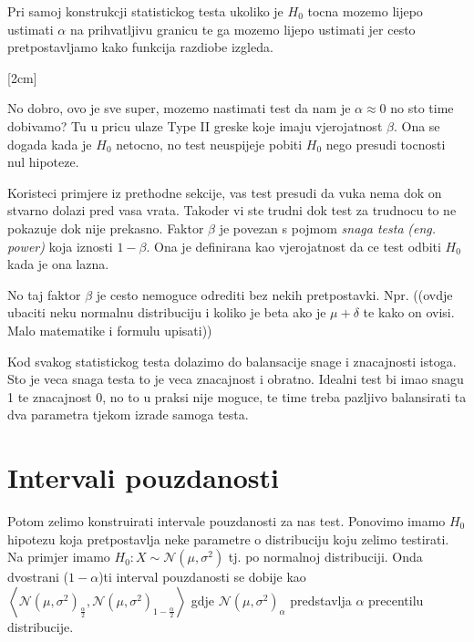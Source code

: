 Pri samoj konstrukcji statistickog testa ukoliko je $H_0$ tocna mozemo lijepo ustimati $\alpha$ na prihvatljivu granicu te ga mozemo lijepo ustimati jer cesto pretpostavljamo kako funkcija razdiobe izgleda. 

[2cm]

No dobro, ovo je sve super, mozemo nastimati test da nam je $\alpha \approx 0$ no sto time dobivamo? Tu u pricu ulaze Type II greske koje imaju vjerojatnost $\beta$. Ona se dogada kada je $H_0$ netocno, no test neuspijeje pobiti $H_0$ nego presudi tocnosti nul hipoteze.

Koristeci primjere iz prethodne sekcije, vas test presudi da vuka nema dok on stvarno dolazi pred vasa vrata. Takoder vi ste trudni dok test za trudnocu to ne pokazuje dok nije prekasno. Faktor $\beta$ je povezan s pojmom \emph{snaga testa} \textit{(eng. power)} koja iznosti $1-\beta$. Ona je definirana kao vjerojatnost da ce test odbiti $H_0$ kada je ona lazna. 

No taj faktor $\beta$ je cesto nemoguce odrediti bez nekih pretpostavki. Npr. ((ovdje ubaciti neku normalnu distribuciju i koliko je beta ako je $\mu  + \delta$ te kako on ovisi. Malo matematike i formulu upisati))

Kod svakog statistickog testa dolazimo do balansacije snage i znacajnosti istoga. Sto je veca snaga testa to je veca znacajnost i obratno. Idealni test bi imao snagu 1 te znacajnost 0, no to u praksi nije moguce, te time treba pazljivo balansirati ta dva parametra tjekom izrade samoga testa.


\section{Intervali pouzdanosti}
Potom zelimo konstruirati intervale pouzdanosti za nas test. Ponovimo imamo $H_0$ hipotezu koja pretpostavlja neke parametre o distribuciju koju zelimo testirati. Na primjer imamo $H_0: X \sim \mathcal{N}(\mu, \sigma^2)$ tj. po normalnoj distribuciji. Onda dvostrani ($1-\alpha$)ti interval pouzdanosti se dobije kao $\left< \mathcal{N}(\mu, \sigma^2)_{\frac{\alpha}{2}}, \mathcal{N}(\mu, \sigma^2)_{1-\frac{\alpha}{2}}\right>$ gdje $\mathcal{N}(\mu, \sigma^2)_\alpha$ predstavlja $\alpha$ precentilu distribucije.

